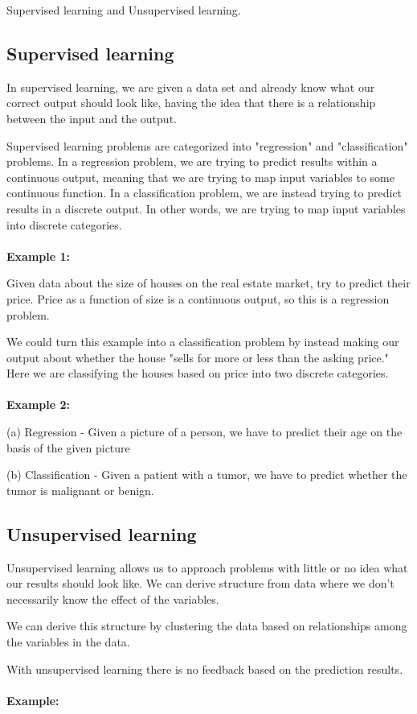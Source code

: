 \documentclass[12pt, A4,onecolumn]{article} %
\begin{document}
Supervised learning and Unsupervised learning.

\subsection{Supervised learning}
In supervised learning, we are given a data set and already know what our correct output should look like, having the idea that there is a relationship between the input and the output.

Supervised learning problems are categorized into "regression" and "classification" problems. In a regression problem, we are trying to predict results within a continuous output, meaning that we are trying to map input variables to some continuous function. In a classification problem, we are instead trying to predict results in a discrete output. In other words, we are trying to map input variables into discrete categories.
\\\\
\textbf{Example 1:}

Given data about the size of houses on the real estate market, try to predict their price. Price as a function of size is a continuous output, so this is a regression problem.

We could turn this example into a classification problem by instead making our output about whether the house "sells for more or less than the asking price." Here we are classifying the houses based on price into two discrete categories.
\\\\
\textbf{Example 2:}

(a) Regression - Given a picture of a person, we have to predict their age on the basis of the given picture

(b) Classification - Given a patient with a tumor, we have to predict whether the tumor is malignant or benign.


\subsection{Unsupervised learning}
Unsupervised learning allows us to approach problems with little or no idea what our results should look like. We can derive structure from data where we don't necessarily know the effect of the variables.

We can derive this structure by clustering the data based on relationships among the variables in the data.

With unsupervised learning there is no feedback based on the prediction results.
\\\\
\textbf{Example:}
\end{document}
